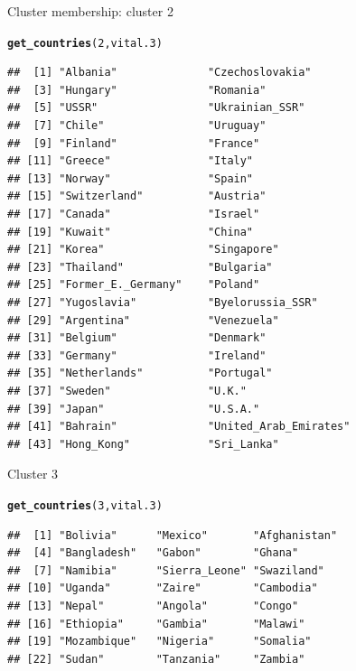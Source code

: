 \documentclass[unknownkeysallowed]{beamer}\usepackage[]{graphicx}\usepackage[]{color}
\makeatletter
\newcommand{\hlnum}[1]{\textcolor[rgb]{0.686,0.059,0.569}{#1}}%
\newcommand{\hlstd}[1]{\textcolor[rgb]{0.345,0.345,0.345}{#1}}%
\newcommand{\hlkwd}[1]{\textcolor[rgb]{0.737,0.353,0.396}{\textbf{#1}}}%
\newenvironment{kframe}{%
 \def\at@end@of@kframe{}%
 \ifinner\ifhmode%
  \def\at@end@of@kframe{\end{minipage}}%
  \begin{minipage}{\columnwidth}%
 \fi\fi%
 \def\FrameCommand##1{\hskip\@totalleftmargin \hskip-\fboxsep
 \colorbox{shadecolor}{##1}\hskip-\fboxsep
     \hskip-\linewidth \hskip-\@totalleftmargin \hskip\columnwidth}%
 \MakeFramed {\advance\hsize-\width
   \@totalleftmargin\z@ \linewidth\hsize
   \@setminipage}}%
 {\par\unskip\endMakeFramed%
 \at@end@of@kframe}
\newenvironment{knitrout}{}{} %
\makeatother
\begin{document}
\begin{frame}[fragile]{Cluster membership: cluster 2}


\begin{knitrout}\scriptsize
{}\color{fgcolor}\begin{kframe}
\begin{alltt}
\hlkwd{get_countries}\hlstd{(}\hlnum{2}\hlstd{,vital.3)}
\end{alltt}
\begin{verbatim}
##  [1] "Albania"              "Czechoslovakia"      
##  [3] "Hungary"              "Romania"             
##  [5] "USSR"                 "Ukrainian_SSR"       
##  [7] "Chile"                "Uruguay"             
##  [9] "Finland"              "France"              
## [11] "Greece"               "Italy"               
## [13] "Norway"               "Spain"               
## [15] "Switzerland"          "Austria"             
## [17] "Canada"               "Israel"              
## [19] "Kuwait"               "China"               
## [21] "Korea"                "Singapore"           
## [23] "Thailand"             "Bulgaria"            
## [25] "Former_E._Germany"    "Poland"              
## [27] "Yugoslavia"           "Byelorussia_SSR"     
## [29] "Argentina"            "Venezuela"           
## [31] "Belgium"              "Denmark"             
## [33] "Germany"              "Ireland"             
## [35] "Netherlands"          "Portugal"            
## [37] "Sweden"               "U.K."                
## [39] "Japan"                "U.S.A."              
## [41] "Bahrain"              "United_Arab_Emirates"
## [43] "Hong_Kong"            "Sri_Lanka"
\end{verbatim}
\end{kframe}
\end{knitrout}

\end{frame}

\begin{frame}[fragile]{Cluster 3}
\begin{knitrout}\footnotesize
{}\color{fgcolor}\begin{kframe}
\begin{alltt}
\hlkwd{get_countries}\hlstd{(}\hlnum{3}\hlstd{,vital.3)}
\end{alltt}
\begin{verbatim}
##  [1] "Bolivia"      "Mexico"       "Afghanistan" 
##  [4] "Bangladesh"   "Gabon"        "Ghana"       
##  [7] "Namibia"      "Sierra_Leone" "Swaziland"   
## [10] "Uganda"       "Zaire"        "Cambodia"    
## [13] "Nepal"        "Angola"       "Congo"       
## [16] "Ethiopia"     "Gambia"       "Malawi"      
## [19] "Mozambique"   "Nigeria"      "Somalia"     
## [22] "Sudan"        "Tanzania"     "Zambia"
\end{verbatim}
\end{kframe}
\end{knitrout}
\end{frame}
\end{document}
